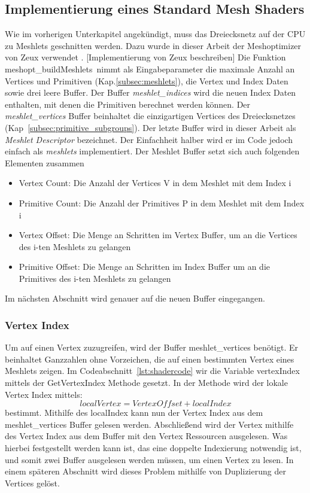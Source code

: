 \subsection{Implementierung eines Standard Mesh Shaders}
\label{subsec:standard_meshshaderimpl}
Wie im vorherigen Unterkapitel angekündigt, muss das Dreiecksnetz auf der CPU zu Meshlets geschnitten werden. 
Dazu wurde in dieser Arbeit der Meshoptimizer von Zeux verwendet \cite{Zeux}. 
[Implementierung von Zeux beschreiben]
Die Funktion \glqq meshopt\_buildMeshlets\grqq\ nimmt als Eingabeparameter die maximale Anzahl an Vertices und Primitiven (Kap.\ref{subsec:meshlets}), die Vertex und Index Daten sowie drei leere Buffer.
Der Buffer \textit{meshlet\_indices} wird die neuen Index Daten enthalten, mit denen die Primitiven berechnet werden können.
Der \textit{meshlet\_vertices} Buffer beinhaltet die einzigartigen Vertices des Dreiecksnetzes (Kap~\ref{subsec:primitive_subgroups}).
Der letzte Buffer wird in dieser Arbeit als \textit{Meshlet Descriptor} bezeichnet.
Der Einfachheit halber wird er im Code jedoch einfach als \textit{meshlets} implementiert.
Der Meshlet Buffer setzt sich auch folgenden Elementen zusammen
\begin{itemize}
\item Vertex Count: Die Anzahl der Vertices V in dem Meshlet mit dem Index i
\item Primitive Count: Die Anzahl der Primitives P in dem Meshlet mit dem Index i
\item Vertex Offset: Die Menge an Schritten im Vertex Buffer, um an die Vertices des i-ten Meshlets zu gelangen
\item Primitive Offset: Die Menge an Schritten im Index Buffer um an die Primitives des i-ten Meshlets zu gelangen
\end{itemize} \cite{Jensen2023}
Im nächsten Abschnitt wird genauer auf die neuen Buffer eingegangen. \newline

\subsubsection*{Vertex Index}
Um auf einen Vertex zuzugreifen, wird der Buffer meshlet\_vertices benötigt.
Er beinhaltet Ganzzahlen ohne Vorzeichen, die auf einen bestimmten Vertex eines Meshlets zeigen.
Im Codeabschnitt~\ref{lst:shadercode} wir die Variable vertexIndex mittels der GetVertexIndex Methode gesetzt.
In der Methode wird der lokale Vertex Index mittels:
\begin{equation*}
localVertex = VertexOffset + localIndex
\end{equation*}
bestimmt.
Mithilfe des localIndex kann nun der Vertex Index aus dem meshlet\_vertices Buffer gelesen werden.
Abschließend wird der Vertex mithilfe des Vertex Index aus dem Buffer mit den Vertex Ressourcen ausgelesen.
Was hierbei festgestellt werden kann ist, das eine doppelte Indexierung notwendig ist, und somit zwei Buffer ausgelesen werden müssen, um einen Vertex zu lesen.
In einem späteren Abschnitt wird dieses Problem mithilfe von Duplizierung der Vertices gelöst.


